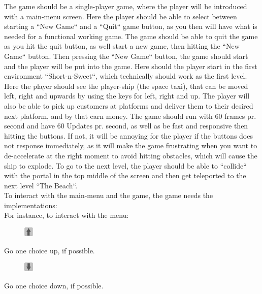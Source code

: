 \documentclass[../master.tex]{subfile}
\begin{document}
The game should be a single-player game, where the player will be introduced with a main-menu screen. Here the player should be able to select between starting a ``New Game`` and a ``Quit`` game button, as you then will have what is needed for a functional working game. The game should be able to quit the game as you hit the quit button, as well start a new game, then hitting the ``New Game`` button. Then pressing the ``New Game`` button, the game should start and the player will be put into the game. Here should the player start in the first environment ``Short-n-Sweet``, which technically should work as the first level. Here the player should see the player-ship (the space taxi), that can be moved left, right and upwards by using the keys for left, right and up. The player will also be able to pick up customers at platforms and deliver them to their desired next platform, and by that earn money. The game should run with 60 frames pr. second and have 60 Updates pr. second, as well as be fast and responsive then hitting the buttons. If not, it will be annoying for the player if the buttons does not response immediately, as it will make the game frustrating when you want to de-accelerate at the right moment to avoid hitting obstacles, which will cause the ship to explode. To go to the next level, the player should be able to ``collide`` with the portal in the top middle of the screen and then get teleported to the next level ``The Beach``.\\

To interact with the main-menu and the game, the game needs the implementations:\\
For instance, to interact with the menu:\\
\begin{figure}
	\vspace{-1.8mm}
	\begin{centering}
		\includegraphics[width=0.04\textwidth]{./Pictures/Pil_op.png}
	\end{centering}
	\vspace{-6mm}
\end{figure}
Go one choice up, if possible.\\

\begin{figure}
	\vspace{-5.8mm}
	\begin{centering}
		\includegraphics[width=0.04\textwidth]{./Pictures/Pil_ned.png}
	\end{centering}
	\vspace{-6mm}
\end{figure}
Go one choice down, if possible.\\
\end{document}
